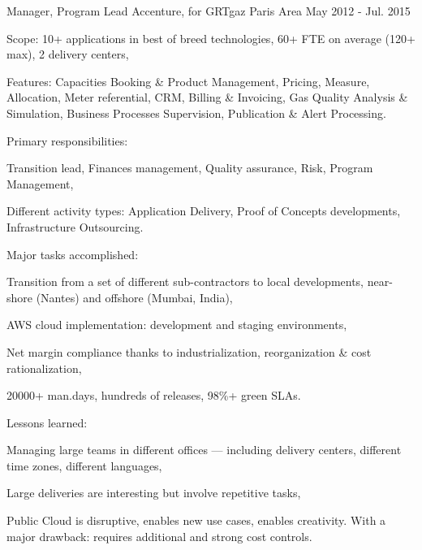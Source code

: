 \begin{cventries}
  \cventry
    {Manager, Program Lead} %
    {Accenture, for GRTgaz} %
    {Paris Area} %
    {May 2012 - Jul. 2015} %
    {
      \begin{cvitems} %
        \item {Scope: 10+ applications in best of breed technologies, 60+ FTE on average (120+ max), 2 delivery centers,}
        \item {Features: Capacities Booking \& Product Management, Pricing, Measure, Allocation, Meter referential, CRM, Billing \& Invoicing, Gas Quality Analysis \& Simulation, Business Processes Supervision, Publication \& Alert Processing.}
        \item {Primary responsibilities:}
        \begin{cvsubitems}
          \item {Transition lead, Finances management, Quality assurance, Risk, Program Management,}
          \item {Different activity types: Application Delivery, Proof of Concepts developments, Infrastructure Outsourcing.}
        \end{cvsubitems}
        \item {Major tasks accomplished:}
        \begin{cvsubitems}
          \item {Transition from a set of different sub-contractors to local developments, near-shore (Nantes) and offshore (Mumbai, India),}
          \item {AWS cloud implementation: development and staging environments,}
          \item {Net margin compliance thanks to industrialization, reorganization \& cost rationalization,}
          \item {20000+ man.days, hundreds of releases, 98\%+ green SLAs.}
        \end{cvsubitems}
        \item {Lessons learned:}
        \begin{cvsubitems}
          \item {Managing large teams in different offices --- including delivery centers, different time zones, different languages,}
          \item {Large deliveries are interesting but involve repetitive tasks,}
          \item {Public Cloud is disruptive, enables new use cases, enables creativity. With a major drawback: requires additional and strong cost controls.}
        \end{cvsubitems}
      \end{cvitems}
    }


\end{cventries}
